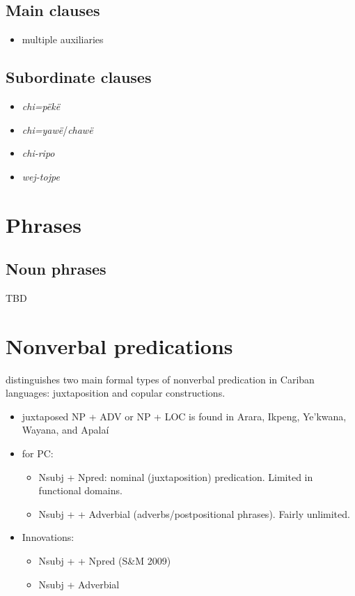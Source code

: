 \documentclass{memoir}
\begin{document}
\section{Main clauses}

\begin{itemize}
\tightlist
\item
  multiple auxiliaries
\end{itemize}

\section{Subordinate clauses}

\begin{itemize}
\tightlist
\item
  \emph{chi=pëkë}
\item
  \emph{chi=yawë}/\emph{chawë}
\item
  \emph{chi-ripo}
\item
  \emph{wej-tojpe}
\end{itemize}

\chapter{\texorpdfstring{Phrases \label{phrases}}{Phrases }}

\section{\texorpdfstring{Noun phrases
\label{sec:nounphrases}}{Noun phrases }}

TBD

\chapter{\texorpdfstring{Nonverbal predications
\label{nonverbal}}{Nonverbal predications }}

\textcites[366]{gildea2018reconstructing} distinguishes two main formal
types of nonverbal predication in Cariban languages: juxtaposition and
copular constructions.

\begin{itemize}
\tightlist
\item
  juxtaposed NP + ADV or NP + LOC is found in Arara, Ikpeng, Ye'kwana,
  Wayana, and Apalaí
\item
  for PC:

  \begin{itemize}
  \tightlist
  \item
    Nsubj + Npred: nominal (juxtaposition) predication. Limited in
    functional domains.
  \item
    Nsubj +  + Adverbial (adverbs/postpositional phrases).
    Fairly unlimited.
  \end{itemize}
\item
  Innovations:

  \begin{itemize}
  \tightlist
  \item
    Nsubj +  + Npred (S\&M 2009)
  \item
    Nsubj + Adverbial
  \end{itemize}
\end{itemize}
\end{document}
